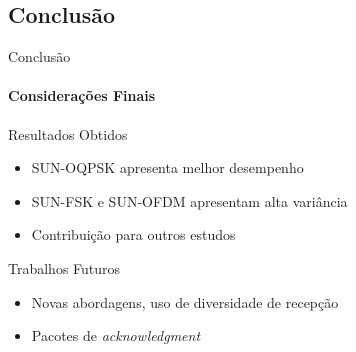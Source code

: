 \documentclass[c]{beamer}
\begin{document}
\begin{darkframes}
  \section{Conclusão}
  \begin{frame}{Conclusão}
    \framesubtitle{Considerações Finais}
    \begin{block}{Resultados Obtidos}
      \begin{itemize}
        \item SUN-OQPSK apresenta melhor desempenho
        \item SUN-FSK e SUN-OFDM apresentam alta variância
        \item Contribuição para outros estudos
      \end{itemize}
    \end{block}

    \begin{block}{Trabalhos Futuros}
      \begin{itemize}
        \item Novas abordagens, uso de diversidade de recepção
        \item Pacotes de \emph{acknowledgment}
      \end{itemize}
    \end{block}
  \end{frame}


\end{darkframes}
\end{document}
